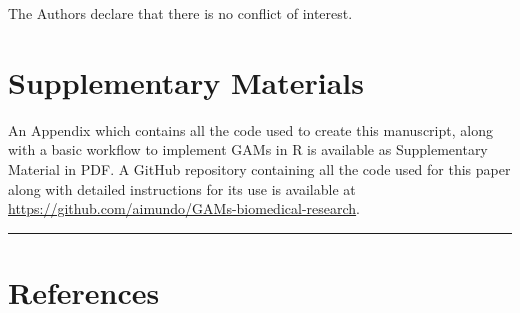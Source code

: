 \documentclass[
]{article}
\begin{document}
The Authors declare that there is no conflict of interest.

\hypertarget{supplementary-materials}{%
\section*{Supplementary Materials}\label{supplementary-materials}}

An Appendix which contains all the code used to create this manuscript, along with a basic workflow to implement GAMs in R is available as Supplementary Material in PDF. A GitHub repository containing all the code used for this paper along with detailed instructions for its use is available at \url{https://github.com/aimundo/GAMs-biomedical-research}.

\begin{center}\rule{0.5\linewidth}{0.5pt}\end{center}

\newpage

\hypertarget{references}{%
\section{References}\label{references}}
\end{document}
